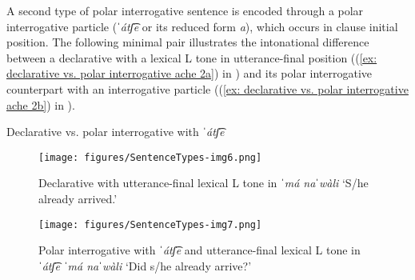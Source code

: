 A second type of polar interrogative sentence is encoded through a polar interrogative particle (\textit{ˈátʃ͡e} or its reduced form \textit{a}), which occurs in clause initial position. The following minimal pair illustrates the intonational difference between a declarative with a lexical L tone in utterance-final position ((\ref{ex: declarative vs. polar interrogative ache 2a}) in ) and its polar interrogative counterpart with an interrogative particle ((\ref{ex: declarative vs. polar interrogative ache 2b}) in ).

\ea\label{ex: declarative vs. polar interrogative ache 2}
{Declarative vs. polar interrogative with \textit{ˈátʃ͡e}}

    \label{ex: declarative vs. polar interrogative ache 2a}
        \label{ex: declarative vs. polar interrogative ache 2b}
    \z
\z

\begin{figure}
\texttt{[image: figures/SentenceTypes-img6.png]}
\caption{
\label{fig: declarative with L tone 2}
Declarative with utterance-final lexical L tone in \textit{ˈmá naˈwàli} `S/he already arrived.' }
\end{figure}

\begin{figure}
\texttt{[image: figures/SentenceTypes-img7.png]}
\caption{
\label{fig: polar interrogative with ache lexical L  tone 2}
Polar interrogative with \textit{ˈátʃ͡e} and utterance-final lexical L tone in \textit{ˈátʃ͡e ˈmá naˈwàli} `Did s/he already arrive?' }
\end{figure}

